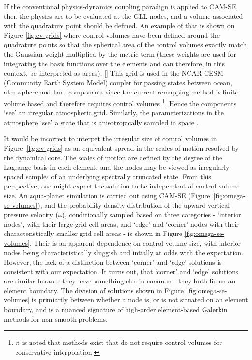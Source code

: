 \documentclass[twocol]{ametsoc}
\begin{document}
If the conventional physics-dynamics coupling paradign is applied to CAM-SE, then the physics are to be evaluated at the GLL nodes, and a volume associated with the quadrature point should be defined. An example of that is shown on Figure \ref{fig:cv-grids} where control volumes have been defined around the quadrature points so that the spherical area of the control volumes exactly match the Gaussian weight multiplied by the metric term (these weights are used for integrating the basis functions over the elements and can therefore, in this context, be interpreted as areas). [{\color{red}{Mark: could we be mathematically more rigorous? perhaps an appendix describing the iterative algorithm?}}] This grid is used in the NCAR CESM (Community Earth System Model) coupler for passing states between ocean, atmosphere and land components since the current remapping method is finite-volume based and therefore requires control volumes {\footnote{it is noted that methods exist that do not require control volumes for conservative interpolation \citep{UT2015MWR}}}. Hence the components `see' an irregular atmospheric grid. Similarly, the parameterizations in the atmosphere `see' a state that is anisotropically sampled in space \citep[see Figure 1 and 5 in ][]{KetAl2008JGR}.%

It would be incorrect to interpet the irregular size of control volumes in Figure~\ref{fig:cv-grids} as an equivalent spread in the scales of motion resolved by the dynamical core. The scales of motion are defined by the degree of the Lagrange basis in each element, and the nodes may be viewed as irregularly spaced samples of an underlying spectrally truncated state. From this perspective, one might expect the solution to be independent of control volume size. An aqua-planet simulation \citep{NH2000ASL,MWO2016JAMES} is carried out using CAM-SE (Figure~\ref{fig:omega-se-volumes}), and the probability density distribution of the upward vertical pressure velocity ($\omega$), conditionally sampled based on three categories - `interior nodes', with their large grid cell areas, and `edge' and `corner' nodes with their characteristically smaller grid cell areas - is shown in Figure \ref{fig:omega-se-volumes}. Their is an apparent dependence on control volume size, with interior nodes being characteristically sluggish and intially at odds with the expectation. However, the lack of a distinction between `corner' and `edge' solutions is consistent with our expectation. It turns out, that `corner' and `edge' solutions are similar because they have something else in common - they both lie on an element boundary. The division of solutions shown in Figure~\ref{fig:omega-se-volumes} is primiarily between whether a node is, or is not situated on an element boundary, and is a nuanced signature of high-order element-based Galerkin methods for non-smooth problems.
\end{document}
